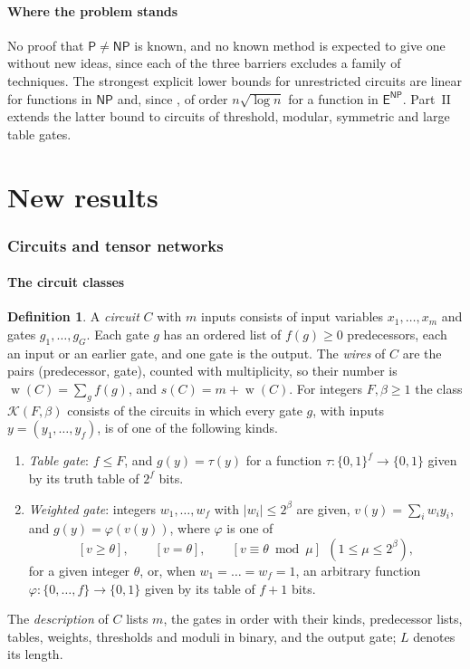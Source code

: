 \documentclass[11pt,reqno]{amsart}
\numberwithin{equation}{section}
\theoremstyle{plain}
\theoremstyle{definition}
\newtheorem{definition}[theorem]{Definition}
\theoremstyle{remark}
\DeclareMathOperator{\wires}{w}
\newcommand{\cK}{\mathcal{K}}
\newcommand{\Pc}{\mathsf{P}}
\newcommand{\NP}{\mathsf{NP}}
\newcommand{\ENP}{\mathsf{E}^{\mathsf{NP}}}
\begin{document}
\subsection{Where the problem stands}
No proof that $\Pc\ne\NP$ is known, and no known method is expected to give
one without new ideas, since each of the three barriers excludes a family of
techniques. The strongest explicit lower bounds for unrestricted circuits are
linear for functions in $\NP$ and, since \cite{OAI26}, of order $n\sqrt{\log
n}$ for a function in $\ENP$. Part~II extends the latter bound to circuits of
threshold, modular, symmetric and large table gates.

\part{New results}

\section{Circuits and tensor networks}\label{sec:networks}

\subsection{The circuit classes}
\begin{definition}\label{def:gates}
A \emph{circuit} $C$ with $m$ inputs consists of input variables
$x_1,\dots,x_m$ and gates $g_1,\dots,g_G$. Each gate $g$ has an ordered list of
$f(g)\ge0$ predecessors, each an input or an earlier gate, and one gate is the
output. The \emph{wires} of $C$ are the pairs (predecessor, gate), counted with
multiplicity, so their number is $\wires(C)=\sum_gf(g)$, and $s(C)=m+\wires(C)$.
For integers $F,\beta\ge1$ the class $\cK(F,\beta)$ consists of the circuits in
which every gate $g$, with inputs $y=(y_1,\dots,y_f)$, is of one of the
following kinds.
\begin{enumerate}[label=\textup{(\alph*)},leftmargin=2.2em]
\item \emph{Table gate}: $f\le F$, and $g(y)=\tau(y)$ for a function
$\tau:\{0,1\}^f\to\{0,1\}$ given by its truth table of $2^f$ bits.
\item \emph{Weighted gate}: integers $w_1,\dots,w_f$ with $|w_i|\le2^\beta$ are
given, $v(y)=\sum_iw_iy_i$, and $g(y)=\varphi(v(y))$, where $\varphi$ is one of
\[
[v\ge\theta],\qquad [v=\theta],\qquad [v\equiv\theta\bmod\mu]\ \ (1\le\mu\le2^\beta),
\]
for a given integer $\theta$, or, when $w_1=\dots=w_f=1$, an arbitrary function
$\varphi:\{0,\dots,f\}\to\{0,1\}$ given by its table of $f+1$ bits.
\end{enumerate}
The \emph{description} of $C$ lists $m$, the gates in order with their kinds,
predecessor lists, tables, weights, thresholds and moduli in binary, and the
output gate; $L$ denotes its length.
\end{definition}
\end{document}

